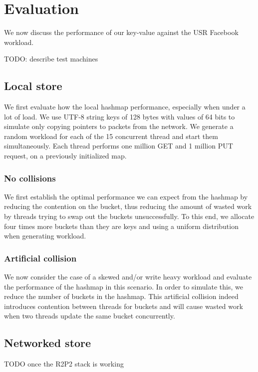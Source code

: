 \documentclass[11pt]{article}
\begin{document}
\section{Evaluation}

We now discuss the performance of our key-value against the USR
Facebook workload.

TODO: describe test machines

\subsection{Local store}

We first evaluate how the local hashmap performance, especially when
under a lot of load. We use UTF-8 string keys of 128 bytes with values
of 64 bits to simulate only copying pointers to packets from the
network. We generate a random workload for each of the 15 concurrent
thread and start them simultaneously. Each thread performs one million
GET and 1 million PUT request, on a previously initialized map.

\subsubsection{No collisions}

We first establish the optimal performance we can expect from the
hashmap by reducing the contention on the bucket, thus reducing the
amount of wasted work by threads trying to swap out the buckets
unsuccessfully. To this end, we allocate four times more buckets than
they are keys and using a uniform distribution when generating
workload.

\subsubsection{Artificial collision}

We now consider the case of a skewed and/or write heavy workload and
evaluate the performance of the hashmap in this scenario. In order to
simulate this, we reduce the number of buckets in the hashmap. This
artificial collision indeed introduces contention between threads for
buckets and will cause wasted work when two threads update the same
bucket concurrently.

\subsection{Networked store}

TODO once the R2P2 stack is working
\end{document}

